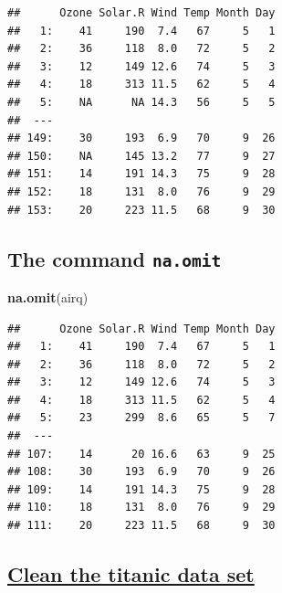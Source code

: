 \documentclass[10pt,]{article}
\newenvironment{Shaded}{\begin{snugshade}}{\end{snugshade}}
\newcommand{\KeywordTok}[1]{\textcolor[rgb]{0.13,0.29,0.53}{\textbf{#1}}}
\newcommand{\NormalTok}[1]{#1}
\begin{document}
\begin{verbatim}
##      Ozone Solar.R Wind Temp Month Day
##   1:    41     190  7.4   67     5   1
##   2:    36     118  8.0   72     5   2
##   3:    12     149 12.6   74     5   3
##   4:    18     313 11.5   62     5   4
##   5:    NA      NA 14.3   56     5   5
##  ---                                  
## 149:    30     193  6.9   70     9  26
## 150:    NA     145 13.2   77     9  27
## 151:    14     191 14.3   75     9  28
## 152:    18     131  8.0   76     9  29
## 153:    20     223 11.5   68     9  30
\end{verbatim}

\subsection{\texorpdfstring{The command
\texttt{na.omit}}{The command na.omit}}\label{the-command-na.omit}

\begin{Shaded}
\begin{Highlighting}[]
\KeywordTok{na.omit}\NormalTok{(airq)}
\end{Highlighting}
\end{Shaded}

\begin{verbatim}
##      Ozone Solar.R Wind Temp Month Day
##   1:    41     190  7.4   67     5   1
##   2:    36     118  8.0   72     5   2
##   3:    12     149 12.6   74     5   3
##   4:    18     313 11.5   62     5   4
##   5:    23     299  8.6   65     5   7
##  ---                                  
## 107:    14      20 16.6   63     9  25
## 108:    30     193  6.9   70     9  26
## 109:    14     191 14.3   75     9  28
## 110:    18     131  8.0   76     9  29
## 111:    20     223 11.5   68     9  30
\end{verbatim}

\subsection{\texorpdfstring{\href{https://www.guru99.com/r-decision-trees.html}{Clean
the titanic data
set}}{Clean the titanic data set}}\label{clean-the-titanic-data-set}
\end{document}
